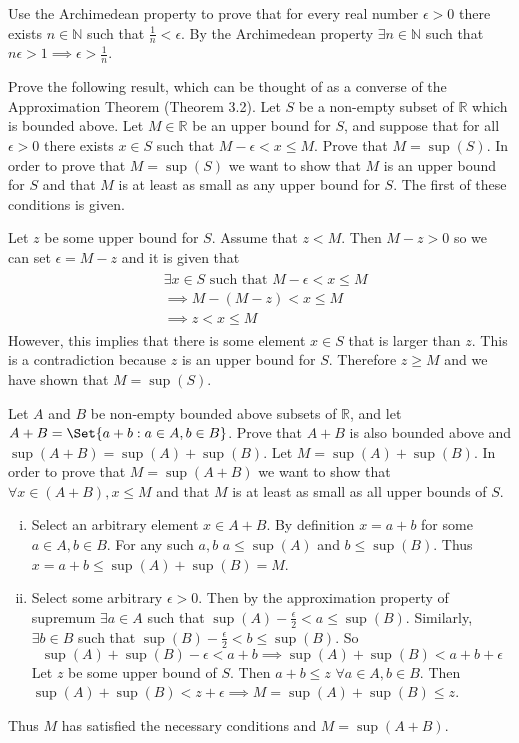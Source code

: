 \documentclass[paper=a4, fontsize=11pt]{jhwhw} %
\begin{document}
Use the Archimedean property to prove that for every real number $\epsilon > 0$ there exists $n\in \mathbb N$ such that $\frac{1}{n} < \epsilon$. 
\solution
By the Archimedean property $\exists n\in \mathbb N$ such that $n\epsilon > 1 \implies \epsilon > \frac{1}{n}$.

Prove the following result, which can be thought of as a converse of the Approximation Theorem (Theorem 3.2). Let $S$ be a non-empty subset of $\mathbb R$ which is bounded above. Let $M\in \mathbb R$ be an upper bound for $S$, and suppose that for all $\epsilon > 0$ there exists $x\in S$ such that $M-\epsilon < x\le M$. Prove that $M = \sup(S)$. 
\solution
In order to prove that $M = \sup(S)$ we want to show that $M$ is an upper bound for $S$ and that $M$ is at least as small as any upper bound for $S$. The first of these conditions is given.

Let $z$ be some upper bound for $S$. Assume that $z < M$. Then $M - z > 0$ so we can set $\epsilon = M - z$ and it is given that 
\begin{align}
    \begin{split}
        &\exists x \in S\text{ such that } M-\epsilon < x \le M\\
        &\implies M - ( M- z) < x \le M\\
        &\implies z < x \le M
    \end{split}
\end{align}
However, this implies that there is some element $x\in S$ that is larger than $z$. This is a contradiction because $z$ is an upper bound for $S$. Therefore $z \ge M$ and we have shown that $M = \sup(S)$. 

Let $A$ and $B$ be non-empty bounded above subsets of $\mathbb R$, and let $A + B = \Set{a + b:a\in A, b\in B}$. Prove that $A + B$ is also bounded above and $\sup(A+B) = \sup(A) + \sup(B)$. 
\solution
Let $M = \sup(A) + \sup(B)$. In order to prove that $M = \sup(A+B)$ we want to show that $\forall x \in (A+B), x\le M$ and that $M$ is at least as small as all upper bounds of $S$. 
\begin{enumerate}[i.]
    \item Select an arbitrary element $x\in A+B$. By definition $x = a+b$ for some $a\in A, b\in B$. For any such $a, b$ $a\le \sup(A)$ and $b\le \sup(B)$. Thus $x = a + b \le \sup(A) + \sup(B) = M$.

    \item Select some arbitrary $\epsilon > 0$. Then by the approximation property of supremum $\exists a\in A$ such that $\sup(A) - \frac{\epsilon}{2} < a \le \sup(B)$. Similarly, $\exists b\in B$ such that $\sup(B) - \frac{\epsilon}{2} < b \le \sup(B)$. So
        $$\sup(A) + \sup(B) - \epsilon < a +b\implies \sup(A) + \sup(B) < a + b + \epsilon$$
        Let $z$ be some upper bound of $S$. Then $a + b \le z$ $\forall a\in A, b\in B$. Then $\sup(A) + \sup(B) < z + \epsilon \implies M = \sup(A) + \sup(B) \le z$. 
\end{enumerate}
Thus $M$ has satisfied the necessary conditions and $M = \sup(A+B)$. 
\end{document}
